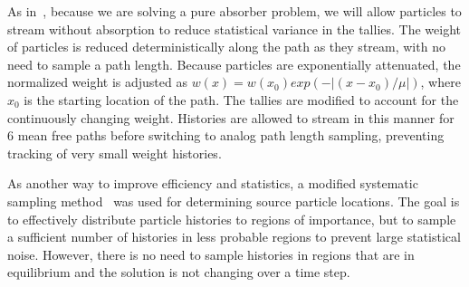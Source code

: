 \documentclass{mc2013}
\begin{document}

As in~\cite{park}, because we are solving a pure absorber problem, we will allow
particles to stream without absorption to reduce statistical 
variance in the tallies.  The weight of particles is reduced deterministically along
the path as they stream, with no need to sample a path length.  Because particles are exponentially attenuated, the normalized weight is
adjusted as $w(x) = w(x_0)exp(-|(x-x_0)/\mu|)$, where $x_0$ is the starting location of the path.  The tallies are modified to account
for the continuously changing weight. Histories are allowed to stream in this manner for 6 mean free paths
before switching to analog path length sampling, preventing tracking of very small weight histories.

As another way to improve efficiency and statistics, a modified systematic
sampling
method~\cite{shultis_mc} was used for determining source particle locations.  The goal is to effectively distribute particle
histories to regions of importance, but to sample a sufficient number of histories in
less probable regions to prevent large statistical noise.  However, there is no need
to sample histories in regions that are in equilibrium and the solution is not
changing over a time step. %
\end{document}
